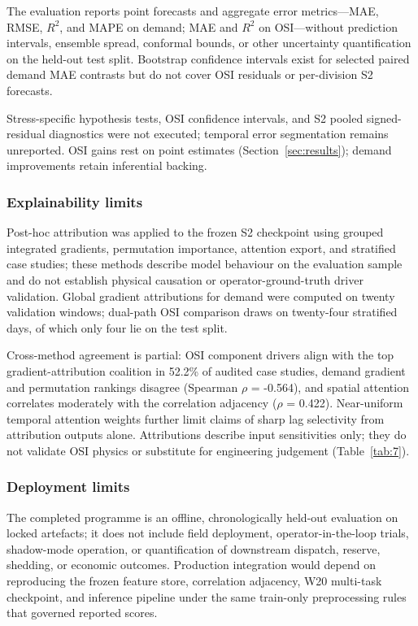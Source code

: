 The evaluation reports point forecasts and aggregate error metrics---MAE, RMSE, $R^2$, and MAPE on demand; MAE and $R^2$ on OSI---without prediction intervals, ensemble spread, conformal bounds, or other uncertainty quantification on the held-out test split. Bootstrap confidence intervals exist for selected paired demand MAE contrasts but do not cover OSI residuals or per-division S2 forecasts.

Stress-specific hypothesis tests, OSI confidence intervals, and S2 pooled signed-residual diagnostics were not executed; temporal error segmentation remains unreported. OSI gains rest on point estimates (Section~\ref{sec:results}); demand improvements retain inferential backing.

\subsubsection{Explainability limits}\label{subsubsection:explainability_limits}

Post-hoc attribution was applied to the frozen S2 checkpoint using grouped integrated gradients, permutation importance, attention export, and stratified case studies; these methods describe model behaviour on the evaluation sample and do not establish physical causation or operator-ground-truth driver validation. Global gradient attributions for demand were computed on twenty validation windows; dual-path OSI comparison draws on twenty-four stratified days, of which only four lie on the test split.

Cross-method agreement is partial: OSI component drivers align with the top gradient-attribution coalition in 52.2\% of audited case studies, demand gradient and permutation rankings disagree (Spearman $\rho$ = -0.564), and spatial attention correlates moderately with the correlation adjacency ($\rho$ = 0.422). Near-uniform temporal attention weights further limit claims of sharp lag selectivity from attribution outputs alone. Attributions describe input sensitivities only; they do not validate OSI physics or substitute for engineering judgement (Table~\ref{tab:7}).

\subsubsection{Deployment limits}\label{subsubsection:deployment_limits}

The completed programme is an offline, chronologically held-out evaluation on locked artefacts; it does not include field deployment, operator-in-the-loop trials, shadow-mode operation, or quantification of downstream dispatch, reserve, shedding, or economic outcomes. Production integration would depend on reproducing the frozen feature store, correlation adjacency, W20 multi-task checkpoint, and inference pipeline under the same train-only preprocessing rules that governed reported scores.

